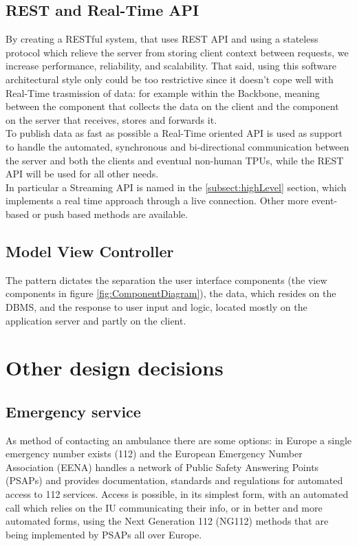 \subsection{REST and Real-Time API}
\label{subsect:API}
By creating a RESTful system, that uses REST API and using a stateless protocol which relieve the server from storing client context between requests, we increase performance, reliability, and scalability. That said, using this software architectural style only could be too restrictive since it doesn't cope well with Real-Time trasmission of data: for example within the Backbone, meaning between the component that collects the data on the client and the component on the server that receives, stores and forwards it. \\
To publish data as fast as possible a Real-Time oriented API is used as support to handle the automated, synchronous and bi-directional communication between the server and both the clients and eventual non-human TPUs, while the REST API will be used for all other needs. \\
In particular a Streaming API is named in the \ref{subsect:highLevel} section, which implements a real time approach through a live connection. Other more event-based or push based methods are available.

\subsection{Model View Controller}
The pattern dictates the separation the user interface components (the view components in figure \ref{fig:ComponentDiagram}), the data, which resides on the DBMS, and the response to user input and logic, located mostly on the application server and partly on the client.
\section{Other design decisions}
\subsection{Emergency service}
\label{subsect:ES}
As method of contacting an ambulance there are some options: in Europe a single emergency number exists (112) and the European Emergency Number Association (EENA) handles a network of Public Safety Answering Points (PSAPs) and provides documentation, standards and regulations for automated access to 112 services. Access is possible, in its simplest form, with an automated call which relies on the IU communicating their info, or in better and more automated forms, using the Next Generation 112 (NG112) methods that are being implemented by PSAPs all over Europe.

